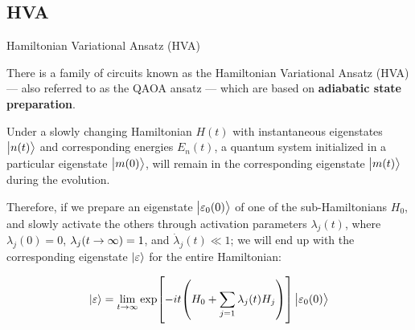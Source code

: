\subsection{HVA}


\begin{frame}[allowframebreaks]{Hamiltonian Variational Ansatz (HVA)}

  There is a family of circuits known as the Hamiltonian Variational Ansatz (HVA) --- also referred to as the QAOA ansatz --- which are based on \textbf{adiabatic state preparation}.

  \begin{theorem}
    Under a slowly changing Hamiltonian $H(t)$ with instantaneous eigenstates $\ket{n(t)}$ and corresponding energies $E_{n}(t)$, a quantum system initialized in a particular eigenstate $\ket{m(0)}$, will remain in the corresponding eigenstate $\ket{m(t)}$ during the evolution.
  \end{theorem}

  Therefore, if we prepare an eigenstate $\ket{\varepsilon_0(0)}$ of one of the sub-Hamiltonians $H_0$, and slowly activate the others through activation parameters $\lambda_j(t)$, where $\lambda_j(0) = 0$, $\lambda_j(t \rightarrow \infty) = 1$, and $\dot{\lambda}_j(t) \ll 1$; we will end up with the corresponding eigenstate $\ket{\varepsilon}$ for the entire Hamiltonian:

  \begin{gather*}
    \ket{\varepsilon} = \lim_{t \rightarrow \infty}
      \exp[-i t \qty(H_0 + \sum_{j=1} \lambda_j(t) H_j)]
      \ket{\varepsilon_0(0)}
  \end{gather*}

\break


\end{frame}

